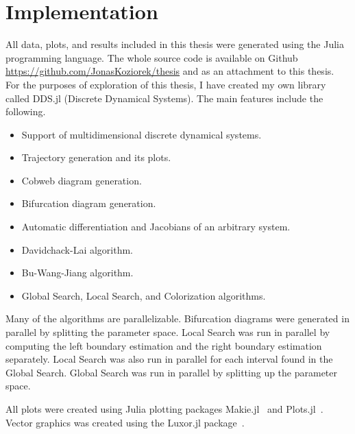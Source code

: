 \section{Implementation}
All data, plots, and results included in this thesis were generated using the Julia programming language.
The whole source code is available on Github \url{https://github.com/JonasKoziorek/thesis} and as an attachment to this thesis.
For the purposes of exploration of this thesis, I have created my own library called DDS.jl (Discrete Dynamical Systems).
The main features include the following.
\begin{itemize}
    \item Support of multidimensional discrete dynamical systems.
    \item Trajectory generation and its plots.
    \item Cobweb diagram generation.
    \item Bifurcation diagram generation.
    \item Automatic differentiation and Jacobians of an arbitrary system.
    \item Davidchack-Lai algorithm.
    \item Bu-Wang-Jiang algorithm.
    \item Global Search, Local Search, and Colorization algorithms.
\end{itemize}
Many of the algorithms are parallelizable.
Bifurcation diagrams were generated in parallel by splitting the parameter space.
Local Search was run in parallel by computing the left boundary estimation and the right boundary estimation separately.
Local Search was also run in parallel for each interval found in the Global Search.
Global Search was run in parallel by splitting up the parameter space.
\par
All plots were created using Julia plotting packages Makie.jl~\cite{Danisch2021} and Plots.jl~\cite{Christ2022}.
Vector graphics was created using the Luxor.jl package~\cite{Luxor2024}.

\endinput